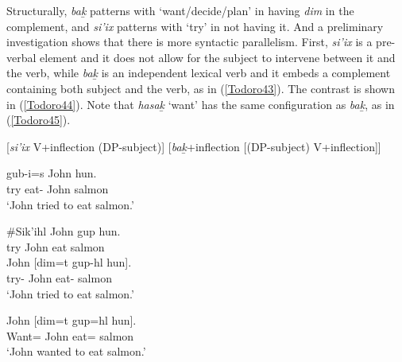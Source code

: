 \documentclass[output=paper]{langscibook}
\begin{document}
Structurally, \emph{bak̲} patterns with ‘want/decide/plan’ in having \emph{dim} in the complement, and \emph{si’ix} patterns with ‘try’ in not having it. And a preliminary investigation shows that there is more syntactic parallelism.
First, \emph{si’ix} is a pre-verbal element and it does not allow for the subject to intervene between it and the verb, while \emph{bak̲} is an independent lexical verb and it embeds a complement containing both subject and the verb, as in (\ref{Todoro43}). The contrast is shown in (\ref{Todoro44}). Note that \emph{hasak̲} ‘want’ has the same configuration as \emph{bak̲}, as in (\ref{Todoro45}). 

\begin{exe}
\ex \label{Todoro43}
\begin{xlist}

\ex \label{Todoroa}
[\emph{si'ix} 	 V+inflection	(DP-subject)]
\ex \label{Todorob}
[\emph{bak̲}+inflection [(DP-subject) V+inflection]]
\end{xlist}
\end{exe}

\begin{exe}
\ex \label{Todoro44}
\begin{xlist}

\ex \label{Todoro44a}
 {gub-i=s} 		{John} 	{hun}. \\
   try 	eat-     	John 	salmon \\
\glt `John tried to eat salmon.' 

\ex \label{Todoro44b}
\gll \#{Sik’ihl} {John}    {gup}    {hun}. \\
    try     	John 	  eat    salmon \\

\ex \label{Todoro44c}
 	{John} [{dim=t} 	    { gup-hl} 		{hun}]. \\
    try-    John  eat- 		salmon\\
\glt `John tried to eat salmon.' 
\end{xlist}
\end{exe}

\begin{exe}
\ex \label{Todoro45}
 	{John} [{dim=t} 		{gup=hl}        {hun}]. \\
    Want=        John 	eat=     salmon\\
\glt `John wanted to eat salmon.' 
\end{exe}
\end{document}
